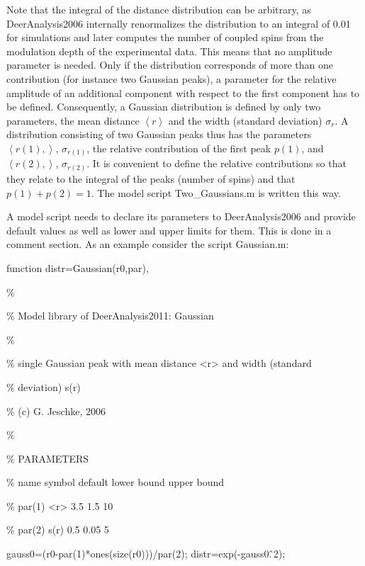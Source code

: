 \documentclass{article}
\begin{document}
Note that the integral of the distance distribution can be arbitrary, as DeerAnalysis2006 internally renormalizes the distribution to an integral of 0.01 for simulations and later computes the number of coupled spins from the modulation depth of the experimental data. This means that no amplitude parameter is needed. Only if the distribution corresponds of more than one contribution (for instance two Gaussian peaks), a parameter for the relative amplitude of an additional component with respect to the first component has to be defined. Consequently, a Gaussian distribution is defined by only two parameters, the mean distance $\left\langle r \right\rangle$ and the width (standard deviation) $\sigma_r$. A distribution consisting of two Gaussian peaks thus has the parameters $\left\langle r(1), \right\rangle$, $\sigma_{r(1)}$, the relative contribution of the first peak $p(1)$, and $\left\langle r(2), \right\rangle$, $\sigma_{r(2)}$. It is convenient to define the relative contributions so that they relate to the integral of the peaks (number of spins) and that $p(1)+p(2)=1$. The model script {\ttfamily Two\_Gaussians.m} is written this way.

A model script needs to declare its parameters to DeerAnalysis2006 and provide default values as well as lower and upper limits for them. This is done in a comment section. As an example consider the script {\ttfamily Gaussian.m}:
\vspace{10pt}

{\ttfamily \small
function distr=Gaussian(r0,par),

\%

\% Model library of DeerAnalysis2011: Gaussian

\%

\% single Gaussian peak with mean distance <r> and width (standard

\% deviation) s(r)

\% (c) G. Jeschke, 2006

\%

\% PARAMETERS

\% name    symbol default lower bound upper bound

\% par(1)  <r>    3.5     1.5         10

\% par(2)  s(r)   0.5     0.05        5

gauss0=(r0-par(1)*ones(size(r0)))/par(2);
distr=exp(-gauss0.\^\,2);   
}

\vspace{10pt}
\end{document}
